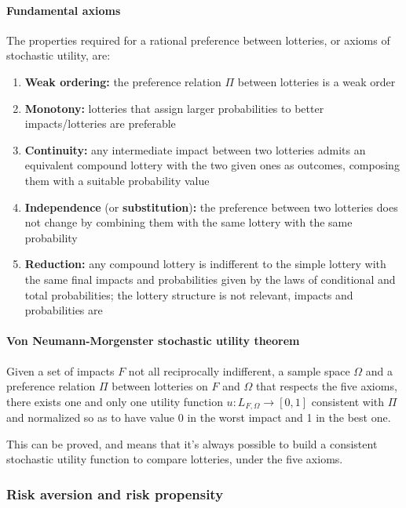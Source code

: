 \paragraph{Fundamental axioms} The properties required for a rational preference between lotteries, or axioms of stochastic utility, are: 
\begin{enumerate}
	\item \textbf{Weak ordering:} the preference relation $\Pi$ between lotteries is a weak order 
	
	\item \textbf{Monotony:} lotteries that assign larger probabilities to better impacts/lotteries are preferable
	
	\item \textbf{Continuity:} any intermediate impact between two lotteries admits an equivalent compound lottery with the two given ones as outcomes, composing them with a suitable probability value
	
	\item \textbf{Independence} (or \textbf{substitution})\textbf{:} the preference between two lotteries does not change by combining them with the same lottery with the same probability
	
	\item \textbf{Reduction:} any compound lottery is indifferent to the simple lottery with the same final impacts and probabilities given by the laws of conditional and total probabilities; the lottery structure is not relevant, impacts and probabilities are
\end{enumerate}

\paragraph{Von Neumann-Morgenster stochastic utility theorem} Given a set of impacts $F$ not all reciprocally indifferent, a sample space $\Omega$ and a preference relation $\Pi$ between lotteries on $F$ and $\Omega$ that respects the five axioms, there exists one and only one utility function $u: L_{F, \Omega} \rightarrow [0,1]$ consistent with $\Pi$ and normalized so as to have value 0 in the worst impact and 1 in the best one.

This can be proved, and means that it's always possible to build a consistent stochastic utility function to compare lotteries, under the five axioms. 

\subsubsection{Risk aversion and risk propensity}

